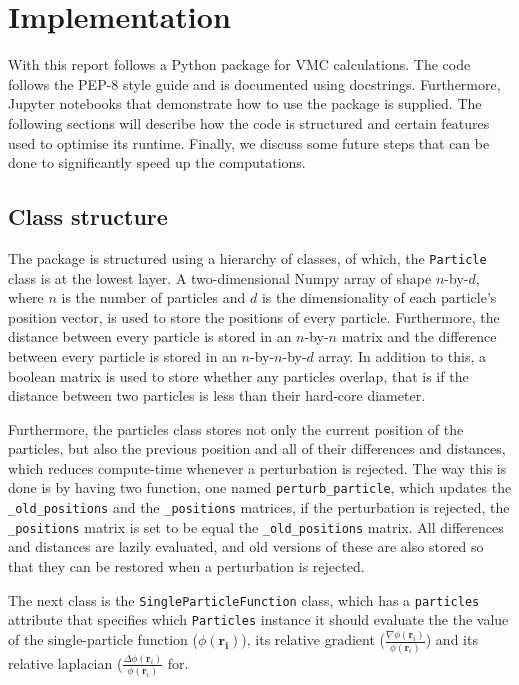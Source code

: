 \documentclass[11pt,a4paper]{article}
\numberwithin{equation}{section}
\begin{document}
\section{Implementation}
With this report follows a Python package for VMC calculations. The code follows the PEP-8 style guide and is documented using docstrings. Furthermore, Jupyter notebooks that demonstrate how to use the package is supplied. The following sections will describe how the code is structured and certain features used to optimise its runtime. Finally, we discuss some future steps that can be done to significantly speed up the computations.

\subsection{Class structure}
The package is structured using a hierarchy of classes, of which, the \texttt{Particle} class is at the lowest layer. A two-dimensional Numpy array of shape $n$-by-$d$, where $n$ is the number of particles and $d$ is the dimensionality of each particle's position vector, is used to store the positions of every particle. Furthermore, the distance between every particle is stored in an $n$-by-$n$ matrix and the difference between every particle is stored in an $n$-by-$n$-by-$d$ array. In addition to this, a boolean matrix is used to store whether any particles overlap, that is if the distance between two particles is less than their hard-core diameter. 

Furthermore, the particles class stores not only the current position of the particles, but also the previous position and all of their differences and distances, which reduces compute-time whenever a perturbation is rejected. The way this is done is by having two function, one named \texttt{perturb\_particle}, which updates the \texttt{\_old\_positions} and the \texttt{\_positions} matrices, if the perturbation is rejected, the \texttt{\_positions} matrix is set to be equal the \texttt{\_old\_positions} matrix. All differences and distances are lazily evaluated, and old versions of these are also stored so that they can be restored when a perturbation is rejected.

The next class is the \texttt{SingleParticleFunction} class, which has a \texttt{particles} attribute that specifies which \texttt{Particles} instance it should evaluate the the value of the single-particle function ($\phi(\bm{r_i})$), its relative gradient ($\frac{\nabla \phi(\bm{r}_i)}{\phi(\bm{r}_i)}$) and its relative laplacian ($\frac{\Delta \phi(\bm{r}_i)}{\phi(\bm{r}_i)}$ for.
\end{document}
